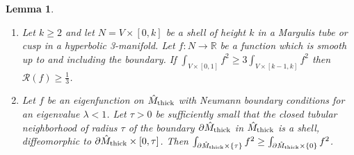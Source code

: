 \documentclass[11pt]{amsart}
\theoremstyle{plain}
\theoremstyle{plain}
\newtheorem{lemma}[theorem]{Lemma}
\theoremstyle{definition}
\newcommand{\cal}{\mathcal}
\begin{document}
\begin{lemma}\label{volumecontrol}
\begin{enumerate}
\item Let $k\geq 2$ and let 
$N=V\times [0,k]$ be a shell of height $k$ in 
a Margulis tube or cusp in a hyperbolic 3-manifold. 
Let $f:N\to \mathbb{R}$ be a function which is smooth up to
and including the boundary. 
If $\int_{V\times [0,1]}f^2\geq 3 \int_{V\times [k-1,k]}f^2$
then ${\cal R}(f)\geq \frac{1}{3}$.
\item Let $f$ be an eigenfunction on $\hat M_{\rm thick}$ with Neumann boundary
  conditions for an eigenvalue $\lambda<1$. Let $\tau>0$ be sufficiently
  small that
the closed tubular neighborhood of radius $\tau$ of 
the boundary $\partial \hat M_{\rm thick}$ in $\hat M_{\rm thick}$ is a
shell, diffeomorphic to $\partial \hat M_{\rm thick}\times [0,\tau]$.  
Then
$\int_{\partial \hat M_{\rm thick}\times \{\tau\}}f^2\geq 
\int_{\partial \hat M_{\rm thick}\times  \{0\}}f^2$. 
\end{enumerate}
\end{lemma}
\end{document}
